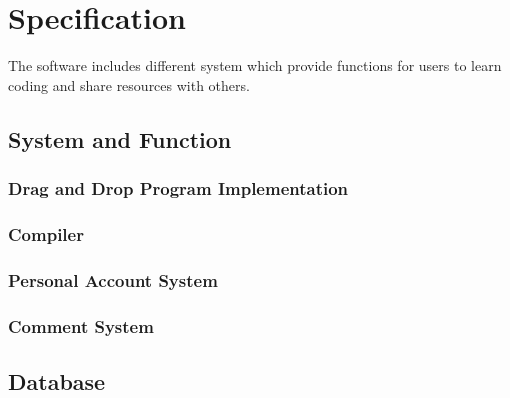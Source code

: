 \chapter{Specification}
The software includes different system which provide functions for users to learn coding and share resources with others.
\section{System and Function}
\subsection{Drag and Drop Program Implementation}
\subsection{Compiler}
\subsection{Personal Account System}
	
\subsection{Comment System}
\section{Database}
